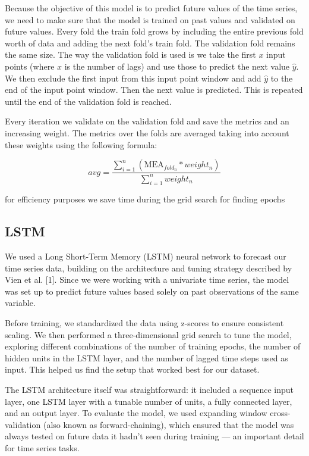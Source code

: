 \documentclass[conference]{IEEEtran}
\begin{document}
Because the objective of this model is to predict future values of the time series, we need to
make sure that the model is trained on past values and validated on future values. Every fold the 
train fold grows by including the entire previous fold worth of data and adding the next fold's train fold.  
The validation fold remains the same size. The way the validation fold is used is we take the first $x$
input points (where $x$ is the number of lags) and use those to predict the next value $\hat{y}$. We then 
exclude the first input from this input point window and add $\hat{y}$ to the end of the input point window.
Then the next value is predicted. This is repeated until the end of the validation fold is reached.




Every iteration we validate on the validation fold and save the metrics and an increasing weight. 
The metrics over the folds are averaged taking into account these weights using the following
formula:

$$avg = \frac{\sum_{i=1}^{n}(\text{MEA}_{fold_n} * weight_n)}{\sum_{i=1}^n weight_n}$$

for efficiency purposes we save time during the grid search for finding epochs 

\subsection{LSTM}
We used a Long Short-Term Memory (LSTM) neural network to forecast our time series data, building on 
the architecture and tuning strategy described by Vien et al. [1]. Since we were working with a univariate 
time series, the model was set up to predict future values based solely on past observations of the same 
variable.

Before training, we standardized the data using z-scores to ensure consistent scaling. We then performed 
a three-dimensional grid search to tune the model, exploring different combinations of the number of 
training epochs, the number of hidden units in the LSTM layer, and the number of lagged time steps used as 
input. This helped us find the setup that worked best for our dataset.

The LSTM architecture itself was straightforward: it included a sequence input layer, one LSTM layer with 
a tunable number of units, a fully connected layer, and an output layer. To evaluate the model, we used 
expanding window cross-validation (also known as forward-chaining), which ensured that the model was 
always tested on future data it hadn’t seen during training — an important detail for time series tasks.
\end{document}
